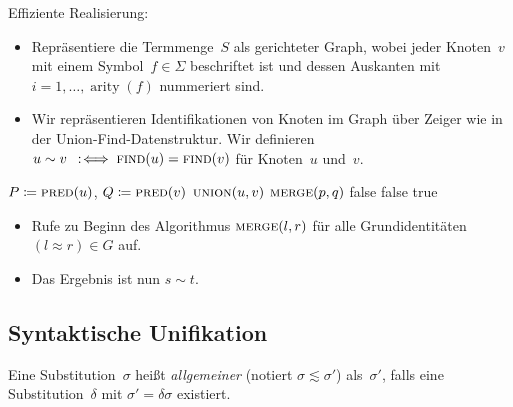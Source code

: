 \documentclass{cheat-sheet}
\DeclareMathOperator{\arity}{arity} %
\newcommand{\ident}{\approx} %
\begin{document}
\begin{samepage}

\begin{alg}
  Effiziente Realisierung:

  \begin{itemize}
    \item Repräsentiere die Termmenge~$S$ als gerichteter Graph, wobei jeder Knoten~$v$ mit einem Symbol~$f \in \Sigma$ beschriftet ist und dessen Auskanten mit $i = 1, \ldots, \arity(f)$ nummeriert sind.
    \item Wir repräsentieren Identifikationen von Knoten im Graph über Zeiger wie in der Union-Find-Datenstruktur.
    Wir definieren $u \sim v \coloniff \Call{find}{u} = \Call{find}{v}$ für Knoten~$u$ und~$v$.
  \end{itemize}

  \begin{algorithmic}[1]
        \State $P \coloneqq \Call{pred}{u}$, $Q \coloneqq \Call{pred}{v}$
        \State $\Call{union}{u, v}$
           \State $\Call{merge}{p, q}$ \EndIf
        \EndFor
      \EndIf
    \EndFunction
       \Return false \EndIf
         \Return false \EndIf
      \EndFor
      \Return true
    \EndFunction
  \end{algorithmic}

  \begin{itemize}
    \item Rufe zu Beginn des Algorithmus $\Call{merge}{l, r}$ für alle Grundidentitäten $(l \ident r) \in G$ auf.
    \item Das Ergebnis ist nun $s \sim t$.
  \end{itemize}
\end{alg}

\subsection{Syntaktische Unifikation}
  
\end{samepage}

\begin{defn}
  Eine Substitution~$\sigma$ heißt \emph{allgemeiner} (notiert $\sigma \lesssim \sigma'$) als~$\sigma'$, falls eine Substitution~$\delta$ mit $\sigma' = \delta \sigma$ existiert.
\end{defn}
\end{document}
